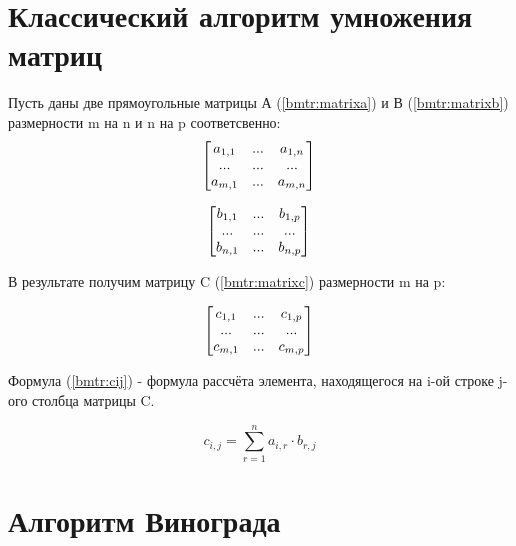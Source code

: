 \documentclass[12pt]{report}
\begin{document}
\section{Классический алгоритм умножения матриц}

Пусть даны две прямоугольные матрицы А (\ref{bmtr:matrixa}) и В (\ref{bmtr:matrixb}) размерности m на n и n на p соответсвенно: 
\begin{equation}
	\label{bmtr:matrixa}
	\begin{bmatrix}
		a_{1,1} & ... & a_{1,n} \\
		... & ... & ... \\
		a_{m,1} & ... & a_{m,n} \\
	\end{bmatrix} \\
\end{equation}

\begin{equation}
	\label{bmtr:matrixb}
	\begin{bmatrix}
		b_{1,1} & ... & b_{1,p} \\
		... & ... & ... \\
		b_{n,1} & ... & b_{n,p} \\
	\end{bmatrix} \\
\end{equation}

В результате получим матрицу C (\ref{bmtr:matrixc}) размерности m на p:

\begin{equation}
	\label{bmtr:matrixc}
	\begin{bmatrix}
		c_{1,1} & ... & c_{1,p} \\
		... & ... & ... \\
		c_{m,1} & ... & c_{m,p} \\
	\end{bmatrix} \\
\end{equation}

Формула (\ref{bmtr:cij}) - формула рассчёта элемента, находящегося на i-ой строке j-ого столбца матрицы C.

\begin{equation}
	\label{bmtr:cij}
	c_{i,j} = \sum\limits_{r=1}^n a_{i,r}\cdot b_{r,j}
\end{equation}

\section{Алгоритм Винограда}
\end{document}
